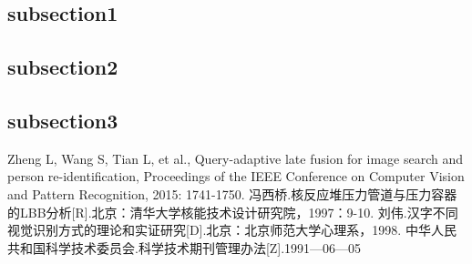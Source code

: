 \documentclass[a4pper]{article}
\begin{document}
\begin{multicols}{2}
    \subsection{subsection1}
    \subsection{subsection2}
    \subsection{subsection3}


\begin{thebibliography}{40}
Zheng L, Wang S, Tian L, et al., Query-adaptive late fusion for image search and person re-identification, Proceedings of the IEEE Conference on Computer Vision and Pattern Recognition, 2015: 1741-1750.
冯西桥.核反应堆压力管道与压力容器的LBB分析[R].北京：清华大学核能技术设计研究院，1997：9-10.
刘伟.汉字不同视觉识别方式的理论和实证研究[D].北京：北京师范大学心理系，1998.
中华人民共和国科学技术委员会.科学技术期刊管理办法[Z].1991—06—05




\end{thebibliography}

\end{multicols}
\end{document}
